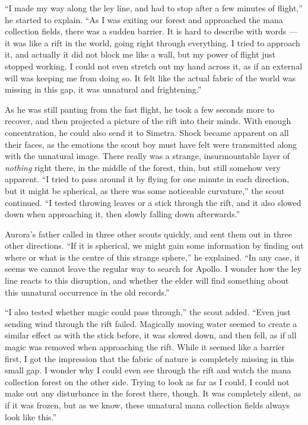 \fancybreaker{}

\enquote{I made my way along the ley line, and had to stop after a few minutes of flight,} he started to explain. \enquote{As I was exiting our forest and approached the mana collection fields, there was a sudden barrier. It is hard to describe with words --- it was like a rift in the world, going right through everything. I tried to approach it, and actually it did not block me like a wall, but my power of flight just stopped working. I could not even stretch out my hand across it, as if an external will was keeping me from doing so. It felt like the actual fabric of the world was missing in this gap, it was unnatural and frightening.}

As he was still panting from the fast flight, he took a few seconds more to recover, and then projected a picture of the rift into their minds. With enough concentration, he could also send it to Simetra. Shock became apparent on all their faces, as the emotions the scout boy must have felt were transmitted along with the unnatural image. There really was a strange, insurmountable layer of \emph{nothing} right there, in the middle of the forest, thin, but still somehow very apparent. \enquote{I tried to pass around it by flying for one minute in each direction, but it might be spherical, as there was some noticeable curvature,} the scout continued. \enquote{I tested throwing leaves or a stick through the rift, and it also slowed down when approaching it, then slowly falling down afterwards.}

Aurora's father called in three other scouts quickly, and sent them out in three other directions. \enquote{If it is spherical, we might gain some information by finding out where or what is the centre of this strange sphere,} he explained. \enquote{In any case, it seems we cannot leave the regular way to search for Apollo. I wonder how the ley line reacts to this disruption, and whether the elder will find something about this unnatural occurrence in the old records.}

\enquote{I also tested whether magic could pass through,} the scout added. \enquote{Even just sending wind through the rift failed. Magically moving water seemed to create a similar effect as with the stick before, it was slowed down, and then fell, as if all magic was removed when approaching the rift. While it seemed like a barrier first, I got the impression that the fabric of nature is completely missing in this small gap. I wonder why I could even see through the rift and watch the mana collection forest on the other side. Trying to look as far as I could, I could not make out any disturbance in the forest there, though. It was completely silent, as if it was frozen, but as we know, these unnatural mana collection fields always look like this.}

